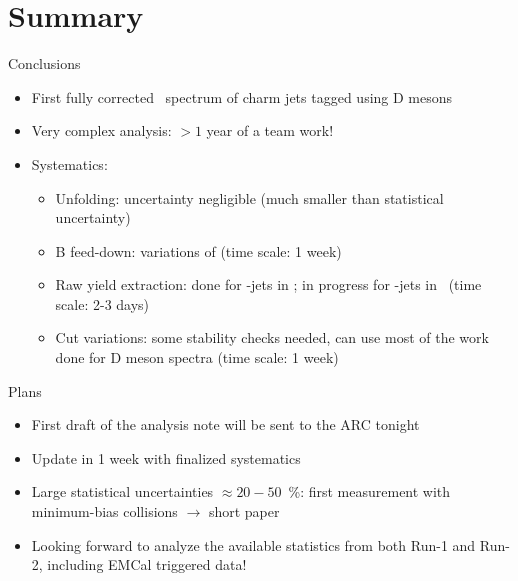 \documentclass[xcolor={usenames,dvipsnames}]{beamer}
\begin{document}
\section*{Summary}

\begin{frame}{Conclusions}
\begin{itemize}
\item First fully corrected \pt\ spectrum of charm jets tagged using D mesons
\item Very complex analysis: $>1$ year of a team work!
\item Systematics:
\begin{itemize}
\item Unfolding: uncertainty negligible (much smaller than statistical uncertainty)
\item B feed-down: variations of (time scale: 1 week)
\item Raw yield extraction: done for \Dstar-jets in \pPb; in progress for \Dzero-jets in \pp\ (time scale: 2-3 days)
\item Cut variations: some stability checks needed, can use most of the work done for D meson spectra (time scale: 1 week)
\end{itemize}
\end{itemize}
\end{frame}

\begin{frame}{Plans}
\begin{itemize}
\item First draft of the analysis note will be sent to the ARC tonight
\item Update in 1 week with finalized systematics
\item Large statistical uncertainties $\approx 20-50$~\%: first measurement with minimum-bias collisions $\rightarrow$ short paper
\item Looking forward to analyze the available statistics from both Run-1 and Run-2, including EMCal triggered data!
\end{itemize}
\end{frame}
\end{document}
